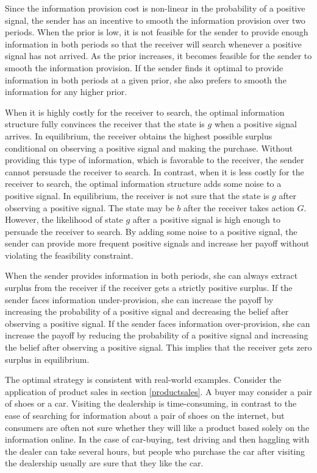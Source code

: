 \documentclass[11pt]{extarticle}
\begin{document}
Since the information provision cost is non-linear in the probability of a positive signal, the sender has an incentive to smooth the information provision over two periods. When the prior is low, it is not feasible for the sender to provide enough information in both periods so that the receiver will search whenever a positive signal has not arrived. As the prior increases, it becomes feasible for the sender to smooth the information provision. If the sender finds it optimal to provide information in both periods at a given prior, she also prefers to smooth the information for any higher prior.

When it is highly costly for the receiver to search, the optimal information structure fully convinces the receiver that the state is $g$ when a positive signal arrives. In equilibrium, the receiver obtains the highest possible surplus conditional on observing a positive signal and making the purchase. Without providing this type of information, which is favorable to the receiver, the sender cannot persuade the receiver to search. In contrast, when it is less costly for the receiver to search, the optimal information structure adds some noise to a positive signal. In equilibrium, the receiver is not sure that the state is $g$ after observing a positive signal. The state may be $b$ after the receiver takes action $G$. However, the likelihood of state $g$ after a positive signal is high enough to persuade the receiver to search. By adding some noise to a positive signal, the sender can provide more frequent positive signals and increase her payoff without violating the feasibility constraint.

When the sender provides information in both periods, she can always extract surplus from the receiver if the receiver gets a strictly positive surplus. If the sender faces information under-provision, she can increase the payoff by increasing the probability of a positive signal and decreasing the belief after observing a positive signal. If the sender faces information over-provision, she can increase the payoff by reducing the probability of a positive signal and increasing the belief after observing a positive signal. This implies that the receiver gets zero surplus in equilibrium.

The optimal strategy is consistent with real-world examples. Consider the application of product sales in section \ref{productsales}. A buyer may consider a pair of shoes or a car. Visiting the dealership is time-consuming, in contrast to the ease of searching for information about a pair of shoes on the internet, but consumers are often not sure whether they will like a product based solely on the information online. In the case of car-buying, test driving and then haggling with the dealer can take several hours, but people who purchase the car after visiting the dealership usually are sure that they like the car.
\end{document}

